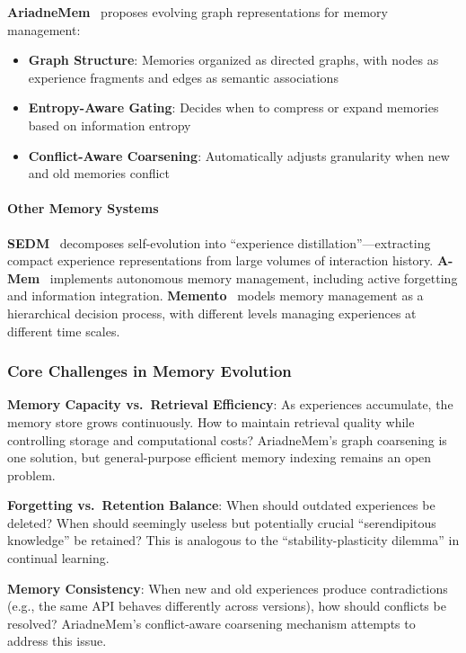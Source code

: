 \textbf{AriadneMem}~\citep{ariadnemem2025} proposes evolving graph representations for memory management:
\begin{itemize}
\item \textbf{Graph Structure}: Memories organized as directed graphs, with nodes as experience fragments and edges as semantic associations
\item \textbf{Entropy-Aware Gating}: Decides when to compress or expand memories based on information entropy
\item \textbf{Conflict-Aware Coarsening}: Automatically adjusts granularity when new and old memories conflict
\end{itemize}

\paragraph{Other Memory Systems}

\textbf{SEDM}~\citep{sedm2024} decomposes self-evolution into ``experience distillation''---extracting compact experience representations from large volumes of interaction history. \textbf{A-Mem}~\citep{amem2024} implements autonomous memory management, including active forgetting and information integration. \textbf{Memento}~\citep{memento2024} models memory management as a hierarchical decision process, with different levels managing experiences at different time scales.

\subsubsection{Core Challenges in Memory Evolution}

\textbf{Memory Capacity vs.\ Retrieval Efficiency}: As experiences accumulate, the memory store grows continuously. How to maintain retrieval quality while controlling storage and computational costs? AriadneMem's graph coarsening is one solution, but general-purpose efficient memory indexing remains an open problem.

\textbf{Forgetting vs.\ Retention Balance}: When should outdated experiences be deleted? When should seemingly useless but potentially crucial ``serendipitous knowledge'' be retained? This is analogous to the ``stability-plasticity dilemma'' in continual learning.

\textbf{Memory Consistency}: When new and old experiences produce contradictions (e.g., the same API behaves differently across versions), how should conflicts be resolved? AriadneMem's conflict-aware coarsening mechanism attempts to address this issue.

